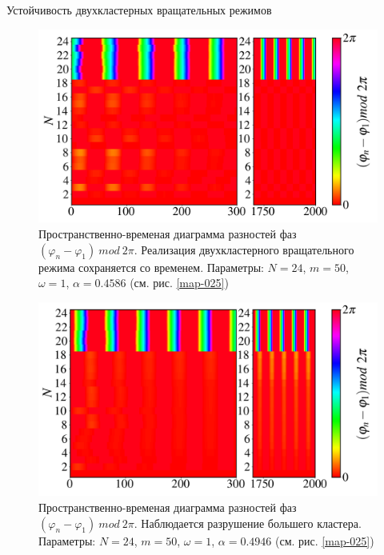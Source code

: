 \begin{chapter}{Устойчивость двухкластерных вращательных режимов}
	\begin{figure}[h!]\center
		\includegraphics[width=1\columnwidth]{pictures/Figure_M_50_A_0.4586_O_1.png}
		\caption{Пространственно-временая диаграмма разностей фаз $(\varphi_n - \varphi_1) \ mod \ 2\pi$.
		Реализация двухкластерного вращательного режима сохраняется со временем.
		Параметры: $N=24$, $m = 50$, $\omega = 1$, $\alpha = 0.4586$ (см. рис. \ref{map-025})}
		\label{st-c-1}
	\end{figure}

	\begin{figure}[h!]\center
		\includegraphics[width=1\columnwidth]{pictures/Figure_M_50_A_0.4946_O_1.png}
		\caption{Пространственно-временая диаграмма разностей фаз $(\varphi_n - \varphi_1) \ mod \ 2\pi$.
		Наблюдается разрушение большего кластера.
		Параметры: $N=24$, $m = 50$, $\omega = 1$, $\alpha = 0.4946$ (см. рис. \ref{map-025})}
		\label{st-c-2}
	\end{figure}


\end{chapter}
